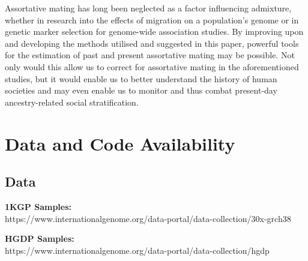 \documentclass[11pt]{article}
\begin{document}
Assortative mating has long been neglected as a factor influencing admixture, whether in research into the effects of migration on a population's genome or in genetic marker selection for genome-wide association studies. By improving upon and developing the methods utilised and suggested in this paper, powerful tools for the estimation of past and present assortative mating may be possible. Not only would this allow us to correct for assortative mating in the aforementioned studies, but it would enable us to better understand the history of human societies and may even enable us to monitor and thus combat present-day ancestry-related social stratification.


















\vspace{8mm}
\section{Data and Code Availability}

\subsection{Data}

\textbf{1KGP Samples:} \\
https://www.internationalgenome.org/data-portal/data-collection/30x-grch38
\vspace{3mm}

\noindent
\textbf{HGDP Samples:} \\
https://www.internationalgenome.org/data-portal/data-collection/hgdp
\vspace{3mm}
\end{document}
